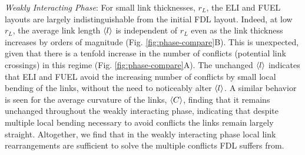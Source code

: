 \documentclass[endfloats,nofootinbib,preprint,floatfix,titlepage,superscriptaddress]{revtex4} %
\begin{document}
{\em Weakly Interacting Phase}: For small link thicknesses, $r_L$, the ELI and FUEL layouts are largely indistinguishable from the initial FDL layout.
Indeed, at low $r_L$, the average link length $\left<l\right>$ is independent of $r_L$ even as the link thickness increases by orders of magnitude (Fig. \ref{fig:phase-compare}B).
This is unexpected, given that there is a tenfold increase in the number of  conflicts (potential link crossings) in this regime (Fig. \ref{fig:phase-compare}A). %
The unchanged $\left<l\right>$ indicates that ELI and FUEL avoid the increasing number of conflicts by small local bending of the links, without the need to noticeably alter $\left<l\right>$.
A similar behavior is seen for the average curvature of the links, $\left<C\right>$, finding that it remains unchanged throughout the weakly interacting phase, indicating that despite multiple local bending necessary to avoid conflicts the links remain largely straight. 
Altogether, we find that in the weakly interacting phase local link rearrangements are sufficient to solve the multiple conflicts FDL suffers from. 
\end{document}
